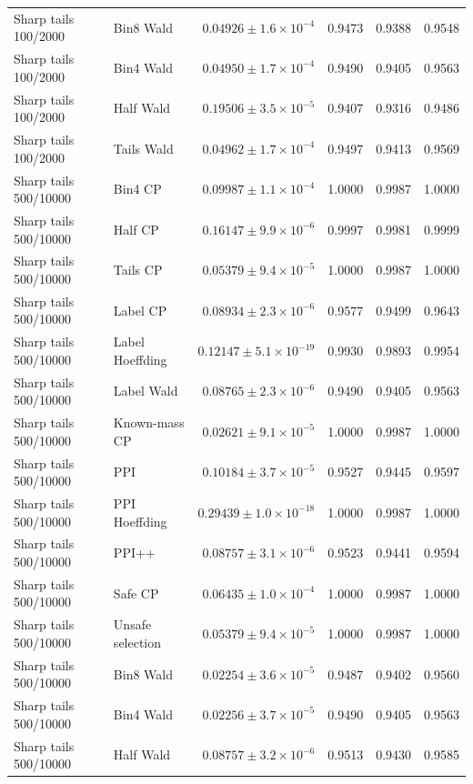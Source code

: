 \begin{longtable}{llrrrr}
Sharp tails 100/2000 & Bin8 Wald & $0.04926\pm 1.6\times 10^{-4}$ & 0.9473 & 0.9388 & 0.9548 \\
Sharp tails 100/2000 & Bin4 Wald & $0.04950\pm 1.7\times 10^{-4}$ & 0.9490 & 0.9405 & 0.9563 \\
Sharp tails 100/2000 & Half Wald & $0.19506\pm 3.5\times 10^{-5}$ & 0.9407 & 0.9316 & 0.9486 \\
Sharp tails 100/2000 & Tails Wald & $0.04962\pm 1.7\times 10^{-4}$ & 0.9497 & 0.9413 & 0.9569 \\
Sharp tails 500/10000 & Bin4 CP & $0.09987\pm 1.1\times 10^{-4}$ & 1.0000 & 0.9987 & 1.0000 \\
Sharp tails 500/10000 & Half CP & $0.16147\pm 9.9\times 10^{-6}$ & 0.9997 & 0.9981 & 0.9999 \\
Sharp tails 500/10000 & Tails CP & $0.05379\pm 9.4\times 10^{-5}$ & 1.0000 & 0.9987 & 1.0000 \\
Sharp tails 500/10000 & Label CP & $0.08934\pm 2.3\times 10^{-6}$ & 0.9577 & 0.9499 & 0.9643 \\
Sharp tails 500/10000 & Label Hoeffding & $0.12147\pm 5.1\times 10^{-19}$ & 0.9930 & 0.9893 & 0.9954 \\
Sharp tails 500/10000 & Label Wald & $0.08765\pm 2.3\times 10^{-6}$ & 0.9490 & 0.9405 & 0.9563 \\
Sharp tails 500/10000 & Known-mass CP & $0.02621\pm 9.1\times 10^{-5}$ & 1.0000 & 0.9987 & 1.0000 \\
Sharp tails 500/10000 & PPI & $0.10184\pm 3.7\times 10^{-5}$ & 0.9527 & 0.9445 & 0.9597 \\
Sharp tails 500/10000 & PPI Hoeffding & $0.29439\pm 1.0\times 10^{-18}$ & 1.0000 & 0.9987 & 1.0000 \\
Sharp tails 500/10000 & PPI++ & $0.08757\pm 3.1\times 10^{-6}$ & 0.9523 & 0.9441 & 0.9594 \\
Sharp tails 500/10000 & Safe CP & $0.06435\pm 1.0\times 10^{-4}$ & 1.0000 & 0.9987 & 1.0000 \\
Sharp tails 500/10000 & Unsafe selection & $0.05379\pm 9.4\times 10^{-5}$ & 1.0000 & 0.9987 & 1.0000 \\
Sharp tails 500/10000 & Bin8 Wald & $0.02254\pm 3.6\times 10^{-5}$ & 0.9487 & 0.9402 & 0.9560 \\
Sharp tails 500/10000 & Bin4 Wald & $0.02256\pm 3.7\times 10^{-5}$ & 0.9490 & 0.9405 & 0.9563 \\
Sharp tails 500/10000 & Half Wald & $0.08757\pm 3.2\times 10^{-6}$ & 0.9513 & 0.9430 & 0.9585 \\

\end{longtable}
